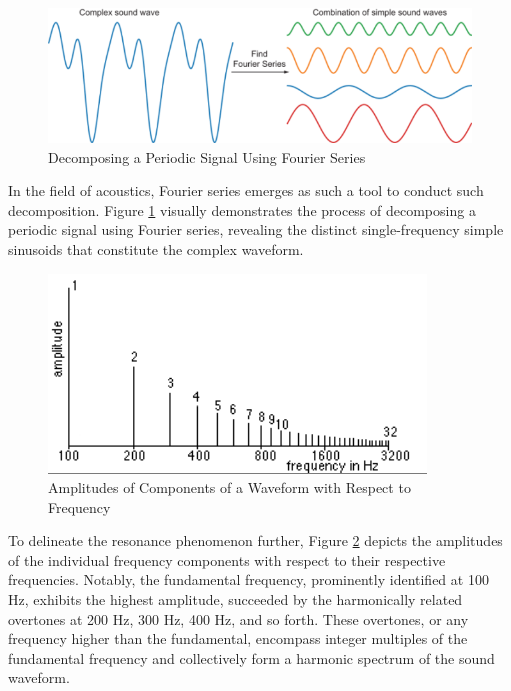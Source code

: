 \documentclass[12pt]{article}
\begin{document}
\begin{figure}[htbp]
    \centering
    \includegraphics[width=\textwidth,height=.6\textheight,keepaspectratio]{decomposing_wave.png}
    \caption{Decomposing a Periodic Signal Using Fourier Series}
    \label{fig:fourier_series}
\end{figure}

In the field of acoustics, Fourier series emerges as such a tool to conduct such decomposition. Figure \ref{fig:fourier_series} visually demonstrates the process of decomposing a periodic signal using Fourier series, revealing the distinct single-frequency simple sinusoids that constitute the complex waveform. 

\begin{figure}[htbp]
    \centering
    \includegraphics[width=\textwidth,height=.6\textheight,keepaspectratio]{spectrum.png}
    \caption{Amplitudes of Components of a Waveform with Respect to Frequency}
    \label{fig:amplitudes_frequency}
\end{figure}

To delineate the resonance phenomenon further, Figure \ref{fig:amplitudes_frequency} depicts the amplitudes of the individual frequency components with respect to their respective frequencies. Notably, the fundamental frequency, prominently identified at 100 Hz, exhibits the highest amplitude, succeeded by the harmonically related overtones at 200 Hz, 300 Hz, 400 Hz, and so forth. These overtones, or any frequency higher than the fundamental, encompass integer multiples of the fundamental frequency and collectively form a harmonic spectrum of the sound waveform.
\end{document}
